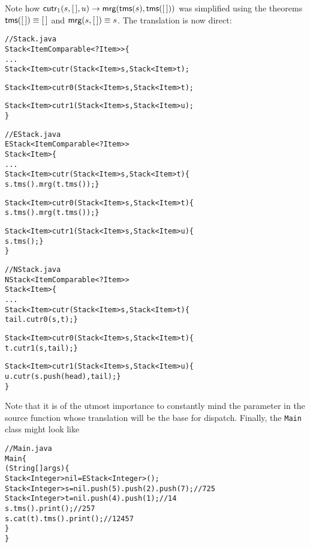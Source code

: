 Note how \(\textsf{cutr}_1(s,[\,],u) \rightarrow
\textsf{mrg}(\textsf{tms}(s),\textsf{tms}([\,]))\) was simplified using the
theorems \(\textsf{tms}([\,]) \equiv [\,]\) and \(\textsf{mrg}(s,[\,]) \equiv
s\). The translation is now direct:
\begin{alltt}
// Stack.java
\public \abstractX
\class Stack<Item \extends Comparable<? \super Item>> \{
  ...
  \public \abstractX
  Stack<Item> cutr(\final Stack<Item> s, \final Stack<Item> t);

  \protectedX \abstractX
  Stack<Item> cutr0(\final Stack<Item> s, \final Stack<Item> t);

  \protectedX \abstractX
  Stack<Item> cutr1(\final Stack<Item> s, \final Stack<Item> u);
\}

// EStack.java
\public \class EStack<Item \extends Comparable<? \super Item>>
\extends Stack<Item> \{
  ...
  \public
  Stack<Item> cutr(\final Stack<Item> s, \final Stack<Item> t) \{
    \return s.tms().mrg(t.tms()); \}

  \protectedX
  Stack<Item> cutr0(\final Stack<Item> s, \final Stack<Item> t) \{
    \return s.tms().mrg(t.tms()); \}

  \protectedX
  Stack<Item> cutr1(\final Stack<Item> s, \final Stack<Item> u) \{
    \return s.tms(); \}
\}

// NStack.java
\public \class NStack<Item \extends Comparable<? \super Item>>
       \extends Stack<Item> \{
  ...
  \public
  Stack<Item> cutr(\final Stack<Item> s, \final Stack<Item> t) \{
    \return tail.cutr0(s,t); \}

  \protectedX
   Stack<Item> cutr0(\final Stack<Item> s, \final Stack<Item> t) \{
    \return t.cutr1(s,tail); \}

  \protectedX
  Stack<Item> cutr1(\final Stack<Item> s, \final Stack<Item> u) \{
    \return u.cutr(s.push(head),tail); \}
\}
\end{alltt}
Note that it is of the utmost importance to constantly mind the
parameter in the source function whose translation will be the base
for dispatch. Finally, the \texttt{Main} class might look like
\begin{alltt}
// Main.java
\public \class Main \{
  \public \static \void \main (String[] args) \{
    Stack<Integer> nil = \new EStack<Integer>();
    Stack<Integer> s = nil.push(5).push(2).push(7);\hfill// 7 2 5
    Stack<Integer> t = nil.push(4).push(1);\hfill// 1 4
    s.tms().print();\hfill// 2 5 7
    s.cat(t).tms().print();\hfill// 1 2 4 5 7
  \}
\}
\end{alltt}

